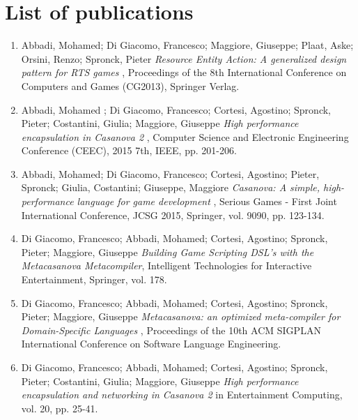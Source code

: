 \chapter*{List of publications}

\begin{enumerate}
\item Abbadi, Mohamed; Di Giacomo, Francesco; Maggiore, Giuseppe; Plaat, Aske; Orsini, Renzo; Spronck, Pieter \textit{Resource Entity Action: A generalized design pattern for RTS games} , Proceedings of the 8th International Conference on Computers and Games (CG2013), Springer Verlag.
\item Abbadi, Mohamed ; Di Giacomo, Francesco; Cortesi, Agostino; Spronck, Pieter; Costantini, Giulia; Maggiore, Giuseppe \textit{High performance encapsulation in Casanova 2} , Computer Science and Electronic Engineering Conference (CEEC), 2015 7th, IEEE, pp. 201-206.
\item Abbadi, Mohamed; Di Giacomo, Francesco; Cortesi, Agostino; Pieter, Spronck; Giulia, Costantini; Giuseppe, Maggiore \textit{Casanova: A simple, high-performance language for game development} , Serious Games - First Joint International Conference, JCSG 2015, Springer, vol. 9090, pp. 123-134.
\item Di Giacomo, Francesco; Abbadi, Mohamed; Cortesi, Agostino; Spronck, Pieter; Maggiore, Giuseppe \textit{Building Game Scripting DSL’s with the Metacasanova Metacompiler}, Intelligent Technologies for Interactive Entertainment, Springer, vol. 178.
\item Di Giacomo, Francesco; Abbadi, Mohamed; Cortesi, Agostino; Spronck, Pieter; Maggiore, Giuseppe \textit{Metacasanova: an optimized meta-compiler for Domain-Specific Languages} , Proceedings of the 10th ACM SIGPLAN International Conference on Software Language Engineering.
\item Di Giacomo, Francesco; Abbadi, Mohamed; Cortesi, Agostino; Spronck, Pieter; Costantini, Giulia; Maggiore, Giuseppe \textit{High performance encapsulation and networking in Casanova 2} in Entertainment Computing, vol. 20, pp. 25-41.
\end{enumerate}